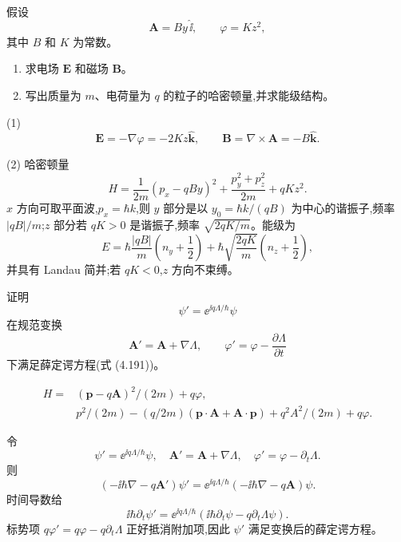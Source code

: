 \begin{question}
假设
\[
\mathbf A=B y\,\hat{\mathbf \ii},\qquad \varphi=Kz^2,
\]
其中 $B$ 和 $K$ 为常数。
\begin{enumerate}
\item 求电场 $\mathbf E$ 和磁场 $\mathbf B$。
\item 写出质量为 $m$、电荷量为 $q$ 的粒子的哈密顿量,并求能级结构。
\end{enumerate}
\begin{solution}

(1) 
\[
\mathbf E=-\nabla\varphi=-2Kz\hat{\mathbf k},
\qquad
\mathbf B=\nabla\times\mathbf A=-B\hat{\mathbf k}.
\]

(2) 哈密顿量
\[
H=\frac{1}{2m}(p_x-qBy)^2+\frac{p_y^2+p_z^2}{2m}+qKz^2.
\]
$x$ 方向可取平面波,$p_x=\hbar k$,则 $y$ 部分是以 $y_0=\hbar k/(qB)$ 为中心的谐振子,频率 $|qB|/m$;$z$ 部分若 $qK>0$ 是谐振子,频率 $\sqrt{2qK/m}$。能级为
\[
E=\hbar\frac{|qB|}{m}\left(n_y+\frac12\right)+\hbar\sqrt{\frac{2qK}{m}}\left(n_z+\frac12\right),
\]
并具有 Landau 简并;若 $qK<0$,$z$ 方向不束缚。

\end{solution}
\end{question}

\begin{question}
证明
\[
\psi'=\ee^{\ii q\Lambda/\hbar}\psi
\]
在规范变换
\[
\mathbf A'=\mathbf A+\nabla\Lambda,
\qquad \varphi'=\varphi-\frac{\partial\Lambda}{\partial t}
\]
下满足薛定谔方程(式 (4.191))。

\par\smallskip
{}\[\begin{aligned}H={}&(\mathbf p-q\mathbf A)^2/(2m)+q\varphi,\\&p^2/(2m)-(q/2m)(\mathbf p\cdot\mathbf A+\mathbf A\cdot\mathbf p)+q^2A^2/(2m)+q\varphi.\end{aligned}\]

\begin{solution}

令
\[
\psi'=\ee^{\ii q\Lambda/\hbar}\psi,
\quad
\mathbf A'=\mathbf A+\nabla\Lambda,
\quad
\varphi'=\varphi-\partial_t\Lambda.
\]
则
\[
(-\ii\hbar\nabla-q\mathbf A')\psi'
=\ee^{\ii q\Lambda/\hbar}(-\ii\hbar\nabla-q\mathbf A)\psi.
\]
时间导数给
\[
\ii\hbar\partial_t\psi'=\ee^{\ii q\Lambda/\hbar}(\ii\hbar\partial_t\psi-q\partial_t\Lambda\psi).
\]
标势项 $q\varphi'=q\varphi-q\partial_t\Lambda$ 正好抵消附加项,因此 $\psi'$ 满足变换后的薛定谔方程。

\end{solution}
\end{question}


